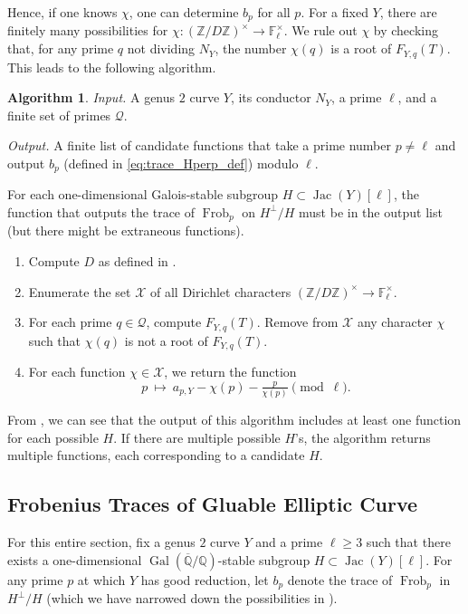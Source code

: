 \documentclass{amsproc}
\numberwithin{equation}{section}
\theoremstyle{definition}
\newtheorem{algorithm}[equation]{Algorithm}
\theoremstyle{remark}
\DeclareMathOperator{\Jac}{Jac}
\DeclareMathOperator{\Frob}{Frob}
\DeclareMathOperator{\Gal}{Gal}
\newcommand{\ZZ}{\mathbb Z}
\newcommand{\QQ}{\mathbb Q}
\newcommand{\FF}{\mathbb F}
\newcommand{\Qbar}{\overline{\QQ}}
\newcommand{\GalQ}{\Gal(\Qbar/\QQ)}
\begin{document}
Hence, if one knows $\chi$, one can determine $b_p$ for all $p$.
For a fixed $Y$, there are finitely many possibilities 
for $\chi : (\ZZ/D\ZZ)^\times \to \FF_\ell^\times$.
We rule out $\chi$ by checking that, for any prime $q$
not dividing $N_Y$, the number $\chi(q)$ is a root of $F_{Y,q}(T)$.
This leads to the following algorithm.

\begin{algorithm}
    \label{alg:frob_trace_recover}
    \emph{Input.} A genus $2$ curve $Y$, its conductor $N_Y$, a prime $\ell$, and a finite set of primes $\mathcal Q$.
    
    \emph{Output.} A finite list of candidate functions that take a prime number $p\neq\ell$ and output $b_p$ (defined in \eqref{eq:trace_Hperp_def}) modulo $\ell$.
    
    For each one-dimensional Galois-stable subgroup $H\subset \Jac(Y)[\ell]$, the function that outputs the trace of $\Frob_p$ on $H^\perp/H$ must be in the output list
    (but there might be extraneous functions). 

    \begin{enumerate}
    \item Compute $D$ as defined in .
    \item Enumerate the set $\mathcal X$ of all Dirichlet characters $(\ZZ/D\ZZ)^\times \to \FF_\ell^\times$.
    \item For each prime $q\in\mathcal Q$, compute $F_{Y,q}(T)$. Remove from $\mathcal X$ any character $\chi$ such that $\chi(q)$ is not a root of $F_{Y,q}(T)$.
    \item For each function $\chi\in \mathcal X$, we return the function
    $$p\ \mapsto\ a_{p,Y} - \chi(p) - \tfrac{p}{\chi(p)}\pmod\ell.$$
    \end{enumerate}
\end{algorithm}
From , we can see that the output of this algorithm includes at least one function for each possible $H$. If there are multiple possible $H$'s, the algorithm returns multiple functions, each corresponding to a candidate $H$.

\subsection{Frobenius Traces of Gluable Elliptic Curve}
\label{subsec:frob_traces}
For this entire section, fix a genus $2$ curve $Y$
and a prime $\ell\geq 3$ such that there exists
a one-dimensional $\GalQ$-stable subgroup
$H\subset \Jac(Y)[\ell]$.
For any prime $p$ at which $Y$ has good reduction,
let $b_p$ denote the trace of $\Frob_p$ in $H^\perp/H$
(which we have narrowed down the possibilities 
in ).
\end{document}
